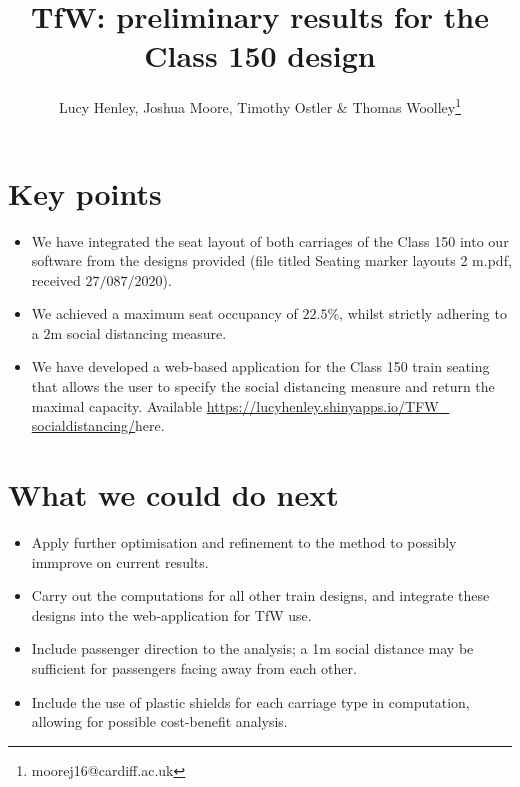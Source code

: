 \documentclass[11pt,a4paper]{article}
\title{TfW: preliminary results for the Class 150 design}
\author{Lucy Henley, Joshua Moore, Timothy Ostler \& Thomas Woolley\footnote{moorej16@cardiff.ac.uk}}
\begin{document}
\maketitle

\section*{Key points}
\begin{itemize}

\item We have integrated the seat layout of both carriages of the Class 150 into our software from the designs provided (file titled Seating marker layouts 2 m.pdf, received $27/087/2020$).
\item We achieved a maximum seat occupancy of $22.5\%$, whilst strictly adhering to a $2$m social distancing measure. 
\item We have developed a web-based application for the Class 150 train seating that allows the user to specify the social distancing measure and return the maximal capacity. Available \href{https://lucyhenley.shinyapps.io/TFW_socialdistancing/}{https://lucyhenley.shinyapps.io/TFW\_ socialdistancing/}{here}.
\end{itemize}

\section*{What we could do next}
\begin{itemize}
\item Apply further optimisation and refinement to the method to possibly immprove on current results.
\item Carry out the computations for all other train designs, and integrate these designs into the web-application for TfW use.
\item Include passenger direction to the analysis; a 1m social distance may be sufficient for passengers facing away from each other.
\item Include the use of plastic shields for each carriage type in computation, allowing for possible cost-benefit analysis.

\end{itemize}
\end{document}
